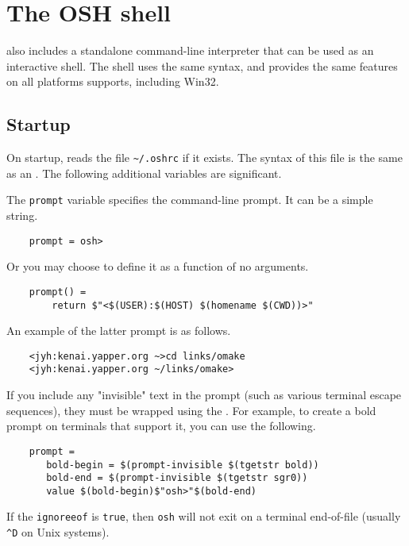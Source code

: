 %
%
%
\chapter{The OSH shell}
\label{chapter:osh}

\OMake{} also includes a standalone command-line interpreter  that can be used as an
interactive shell.  The shell uses the same syntax, and provides the same features on all platforms
 supports, including Win32.

\section{Startup}

On startup,  reads the file \verb+~/.oshrc+ if it exists.  The syntax of this file is the
same as an .  The following additional variables are significant.

  The \verb+prompt+ variable specifies the command-line prompt.
It can be a simple string.

\begin{verbatim}
    prompt = osh>
\end{verbatim}

Or you may choose to define it as a function of no arguments.

\begin{verbatim}
    prompt() =
        return $"<$(USER):$(HOST) $(homename $(CWD))>"
\end{verbatim}

An example of the latter prompt is as follows.

\begin{verbatim}
    <jyh:kenai.yapper.org ~>cd links/omake
    <jyh:kenai.yapper.org ~/links/omake>
\end{verbatim}

If you include any "invisible" text in the prompt (such as various terminal
escape sequences), they must be wrapped using the
. For example, to create a bold prompt on
terminals that support it, you can use the following.
\begin{verbatim}
    prompt =
       bold-begin = $(prompt-invisible $(tgetstr bold))
       bold-end = $(prompt-invisible $(tgetstr sgr0))
       value $(bold-begin)$"osh>"$(bold-end)
\end{verbatim}

   If the \verb+ignoreeof+ is \verb+true+, then \verb+osh+ will not exit on
   a terminal end-of-file (usually \verb+^D+ on Unix systems).

